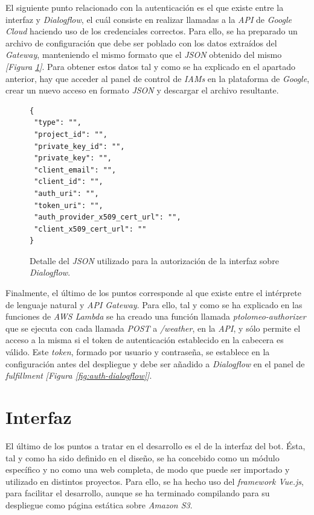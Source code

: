\documentclass[11pt,spanish,listoffigures]{tfgetsinf}
\begin{document}
El siguiente punto relacionado con la autenticación es el que existe entre la interfaz y \textit{Dialogflow}, el cuál consiste en realizar llamadas a la \textit{API} de \textit{Google Cloud} haciendo uso de los credenciales correctos. Para ello, se ha preparado un archivo de configuración que debe ser poblado con los datos extraídos del \textit{Gateway}, manteniendo el mismo formato que el \textit{JSON} obtenido del mismo \textit{[Figura \ref{fig:json1}]}. Para obtener estos datos tal y como se ha explicado en el apartado anterior, hay que acceder al panel de control de \textit{IAMs} en la plataforma de \textit{Google}, crear un nuevo acceso en formato \textit{JSON} y descargar el archivo resultante.

\begin{figure}[h!]
    \centering
    \begin{lstlisting}
{
 "type": "",
 "project_id": "",
 "private_key_id": "",
 "private_key": "",
 "client_email": "",
 "client_id": "",
 "auth_uri": "",
 "token_uri": "",
 "auth_provider_x509_cert_url": "",
 "client_x509_cert_url": ""
}
    \end{lstlisting}
    \caption{Detalle del \textit{JSON} utilizado para la autorización de la interfaz sobre \textit{Dialogflow}.}
    \label{fig:json1}
\end{figure}

Finalmente, el último de los puntos corresponde al que existe entre el intérprete de lenguaje natural y \textit{API Gateway}. Para ello, tal y como se ha explicado en las funciones de \textit{AWS Lambda} se ha creado una función llamada \textit{ptolomeo-authorizer} que se ejecuta con cada llamada \textit{POST} a \textit{/weather}, en la \textit{API}, y sólo permite el acceso a la misma si el token de autenticación establecido en la cabecera es válido. Este \textit{token}, formado por usuario y contraseña, se establece en la configuración antes del despliegue y debe ser añadido a \textit{Dialogflow} en el panel de \textit{fulfillment} \textit{[Figura \ref{fig:auth-dialogflow}]}.


\section{Interfaz}
\label{sec:development-interfaz}

El último de los puntos a tratar en el desarrollo es el de la interfaz del bot. Ésta, tal y como ha sido definido en el diseño, se ha concebido como un módulo específico y no como una web completa, de modo que puede ser importado y utilizado en distintos proyectos. Para ello, se ha hecho uso del \textit{framework Vue.js}, para facilitar el desarrollo, aunque se ha terminado compilando para su despliegue como página estática sobre \textit{Amazon S3}.
\end{document}
